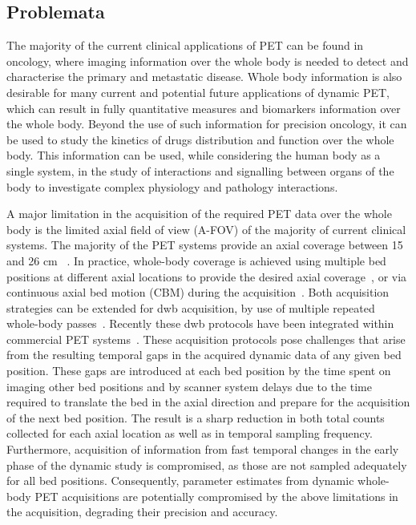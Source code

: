 \subsection*{Problemata}
The majority of the current clinical applications of PET can be found in oncology, where imaging information over the whole body is needed to detect and characterise the primary and metastatic disease. 
Whole body information is also desirable for many current and potential future applications of dynamic PET, which can result in fully quantitative measures and biomarkers information over the whole body. Beyond the use of such information for precision oncology, it can be used to study the kinetics of drugs distribution and function over the whole body.
This information can be used, while considering the human body as a single system, in the study of interactions and signalling between organs of the body to investigate complex physiology and pathology interactions.

A major limitation in the acquisition of the required PET data over the whole body is the limited axial field of view (A-FOV) of the majority of current clinical systems. The majority of the PET systems provide an axial coverage between 15 and 26 cm ~\cite{Vandenberghe2020}. 
In practice, whole-body coverage is achieved using multiple bed positions at different axial locations to provide the desired axial coverage~\cite{Schubert1996}, or via continuous axial bed motion (CBM) during the acquisition~\cite{Panin2014}. 
Both acquisition strategies can be extended for \gls{dwb} acquisition, by use of multiple repeated whole-body passes~\cite {Karakatsanis2011,Karakatsanis2013,Rahmim2019}.
Recently these \gls{dwb} protocols have been integrated within commercial PET systems~\cite{Hu2020}. 
These acquisition protocols pose challenges that arise from the resulting temporal gaps in the acquired dynamic data of any given bed position. These gaps are introduced at each bed position by the time spent on imaging other bed positions and by scanner system delays due to the time required to translate the bed in the axial direction and prepare for the acquisition of the next bed position. The result is a sharp reduction in both total counts collected for each axial location as well as in temporal sampling frequency. Furthermore, acquisition of information from fast temporal changes in the early phase of the dynamic study is compromised, as those are not sampled adequately for all bed positions. Consequently, parameter estimates from dynamic whole-body PET acquisitions are potentially compromised by the above limitations in the acquisition, degrading their precision and accuracy.


